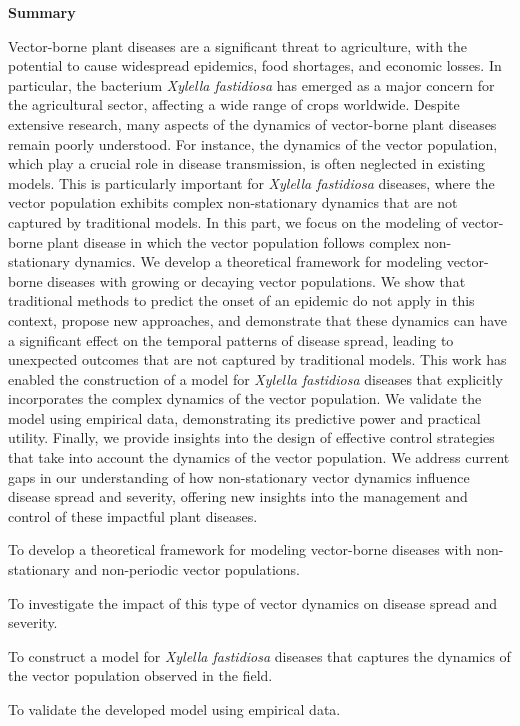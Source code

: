 \thispagestyle{empty}

\begin{center}
    \textbf{\Large Summary}
\end{center}

Vector-borne plant diseases are a significant threat to agriculture, with the
potential to cause widespread epidemics, food shortages, and economic losses.
In particular, the bacterium \textit{Xylella fastidiosa} has emerged as a major
concern for the agricultural sector, affecting a wide range of crops worldwide.
Despite extensive research, many aspects of the dynamics of vector-borne plant
diseases remain poorly understood. For instance, the dynamics of the vector
population, which play a crucial role in disease transmission, is often
neglected in existing models. This is particularly important for
\textit{Xylella fastidiosa} diseases, where the vector population exhibits
complex non-stationary dynamics that are not captured by traditional
models. In this part, we focus on the modeling of vector-borne plant disease
in which the vector population follows complex non-stationary dynamics. We
develop a theoretical framework for modeling vector-borne diseases with
growing or decaying vector populations. We show that traditional methods to
predict the onset of an epidemic do not apply in this context, propose new
approaches, and demonstrate that these dynamics can have a significant
effect on the temporal patterns of disease spread, leading to unexpected
outcomes that are not captured by traditional models. This work has
enabled the construction of a model for \textit{Xylella fastidiosa} diseases
that explicitly incorporates the complex dynamics of the vector population. We
validate the model using empirical data, demonstrating its predictive power and
practical utility. Finally, we provide insights into the design of effective
control strategies that take into account the dynamics of the vector
population. We address current gaps in our understanding of how non-stationary
vector dynamics influence disease spread and severity, offering new insights
into the management and control of these impactful plant diseases.

\vspace{1cm}

\begin{objectiveslist}
    \item To develop a theoretical framework for modeling vector-borne
    diseases with non-stationary and non-periodic vector populations.

    \item To investigate the impact of this type of vector dynamics on
    disease spread and severity.

    \item To construct a model for \textit{Xylella fastidiosa} diseases that
    captures the dynamics of the vector population observed in the field.

    \item To validate the developed model using empirical data.

\end{objectiveslist}

